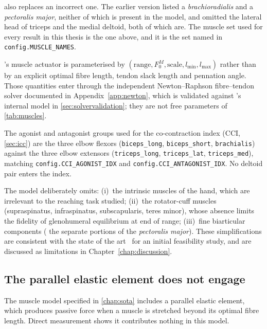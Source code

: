  also replaces an incorrect one. The earlier version listed a
\emph{brachioradialis} and a \emph{pectoralis major}, neither of which is present
in the model, and omitted the lateral head of triceps and the medial deltoid,
both of which are. The muscle set used for every result in this thesis is the one
above, and it is the set named in \texttt{config.MUSCLE\_NAMES}.

\MuJoCo{}'s muscle actuator is parameterised by
$(\text{range}, F_0^M, \text{scale}, l_{\min}, l_{\max})$ rather than by an
explicit optimal fibre length, tendon slack length and pennation angle. Those
quantities enter through the independent Newton--Raphson fibre--tendon solver
documented in Appendix~\ref{app:newton}, which is validated against \MuJoCo{}'s
internal model in \cref{sec:solvervalidation}; they are not free parameters of
\cref{tab:muscles}.

The agonist and antagonist groups used for the co-contraction index
(CCI, \cref{sec:icc}) are the three elbow flexors
(\texttt{biceps\_long}, \texttt{biceps\_short}, \texttt{brachialis}) against the
three elbow extensors (\texttt{triceps\_long}, \texttt{triceps\_lat},
\texttt{triceps\_med}), matching \texttt{config.CCI\_AGONIST\_IDX} and
\texttt{config.CCI\_ANTAGONIST\_IDX}. No deltoid pair enters the index.

\begin{remarque}
The model deliberately omits: (i)~the intrinsic muscles of the hand, which are
irrelevant to the reaching task studied; (ii)~the rotator-cuff muscles
(supraspinatus, infraspinatus, subscapularis, teres minor), whose absence limits
the fidelity of glenohumeral equilibrium at end of range; (iii)~fine biarticular
components (\eg{} the separate portions of the \textit{pectoralis major}).
These simplifications are consistent with the state of the
art~\parencite{Codol2023, Caggiano2022} for an initial \DRL{} feasibility study,
and are discussed as limitations in Chapter~\ref{chap:discussion}.
\end{remarque}

\subsection{The parallel elastic element does not engage}
\label{sec:peeinert}

The muscle model specified in \cref{chap:sota} includes a parallel elastic
element, which produces passive force when a muscle is stretched beyond its
optimal fibre length. Direct measurement shows it contributes nothing in this
model.


